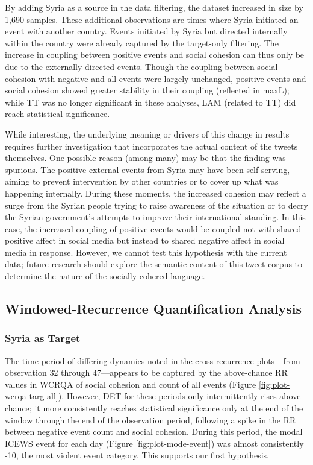 \documentclass[
  english,
  man]{apa6}
\begin{document}
By adding Syria as a source in the data filtering, the dataset increased in size
by 1,690 samples. These additional observations are times where Syria initiated
an event with another country. Events initiated by Syria but directed internally
within the country were already captured by the target-only filtering. The
increase in coupling between positive events and social cohesion can thus only
be due to the externally directed events. Though the coupling between social
cohesion with negative and all events were largely unchanged, positive events
and social cohesion showed greater stability in their coupling (reflected in
maxL); while TT was no longer significant in these analyses, LAM (related to TT)
did reach statistical significance.

While interesting, the underlying meaning or drivers of this change in results
requires further investigation that incorporates the actual content of the
tweets themselves. One possible reason (among many) may be that the finding was
spurious. The positive external events from Syria may have been self-serving,
aiming to prevent intervention by other countries or to cover up what was
happening internally. During these moments, the increased cohesion may reflect a
surge from the Syrian people trying to raise awareness of the situation or to
decry the Syrian government's attempts to improve their international standing.
In this case, the increased coupling of positive events would be coupled not
with shared positive affect in social media but instead to shared negative
affect in social media in response. However, we cannot test this hypothesis with
the current data; future research should explore the semantic content of this
tweet corpus to determine the nature of the socially cohered language.

\hypertarget{windowed-recurrence-quantification-analysis}{%
\subsection{Windowed-Recurrence Quantification Analysis}\label{windowed-recurrence-quantification-analysis}}

\hypertarget{syria-as-target-3}{%
\subsubsection{Syria as Target}\label{syria-as-target-3}}

The time period of differing dynamics noted in the cross-recurrence plots---from
observation 32 through 47---appears to be captured by the above-chance RR values
in WCRQA of social cohesion and count of all events (Figure
\ref{fig:plot-wcrqa-targ-all}). However, DET for these periods only
intermittently rises above chance; it more consistently reaches statistical
significance only at the end of the window through the end of the observation
period, following a spike in the RR between negative event count and social
cohesion. During this period, the modal ICEWS event for each day (Figure
\ref{fig:plot-mode-event}) was almost consistently -10, the most violent event
category. This supports our first hypothesis.
\end{document}

